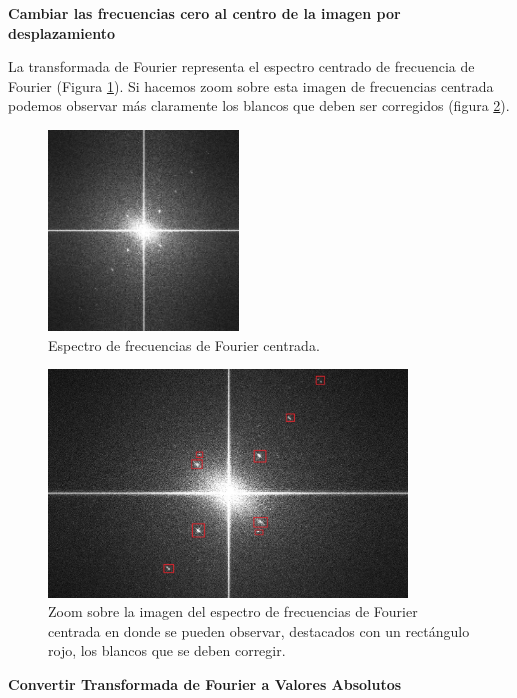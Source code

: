 \documentclass[10pt,a4paper, twoside]{report}
\begin{document}
\textbf{Cambiar las frecuencias cero al centro de la imagen por desplazamiento}

La transformada de Fourier representa el espectro centrado de frecuencia de Fourier (Figura \ref{FourierTransform}). Si hacemos zoom sobre esta imagen de frecuencias centrada podemos observar más claramente los blancos que deben ser corregidos (figura \ref{ZoomFourierTransformBlancos}).

\begin{figure}[!htb]
   \centering      
   \includegraphics[width=0.45\textwidth]{imagenes/FourierTransform.jpg}
 \caption{Espectro de frecuencias de Fourier centrada.}
 \label{FourierTransform}
\end{figure}

\begin{figure}[!htb]
   \centering      
   \includegraphics[width=0.85\textwidth]{imagenes/ZoomFourierTransformBlancos.jpg}
 \caption{Zoom sobre la imagen del espectro de frecuencias de Fourier centrada en donde se pueden observar, destacados con un rectángulo rojo, los blancos que se deben corregir.}
 \label{ZoomFourierTransformBlancos}
\end{figure}

\textbf{Convertir Transformada de Fourier a Valores Absolutos}
\end{document}

